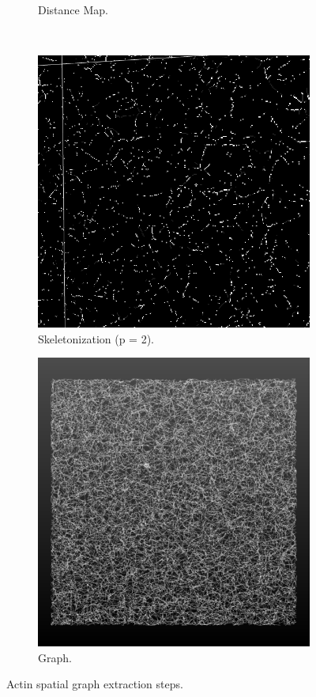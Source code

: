 \begin{figure}[H]
\begin{subfigure}{0.5\textwidth}
    \caption{Distance Map.}
    \label{subfig:actin_dmap}
  \end{subfigure}\\[1ex]
  \begin{subfigure}{0.5\textwidth}
    \centering
    \includegraphics[width=0.9\linewidth]{Figures/chapter-image/pipeline_screenshots/actin_skeleton.png}
    \caption{Skeletonization (p = 2).}
    \label{subfig:actin_skeleton}
  \end{subfigure}%
  \begin{subfigure}{0.5\textwidth}
    \centering
    \includegraphics[width=0.9\linewidth]{Figures/chapter-image/pipeline_screenshots/actin_graph.png}
    \caption{Graph.}
    \label{fig:actin_graph}
  \end{subfigure}%
  \caption{Actin spatial graph extraction steps.}
  \label{fig:actin_all}
\end{figure}

